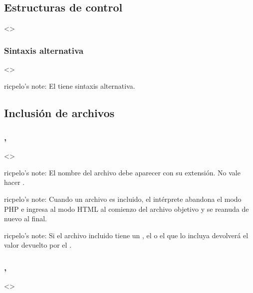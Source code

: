 \documentclass[a4paper,12pt,spanish]{sphinxmanual}
\begin{document}
\subsection{Estructuras de control}
\label{\detokenize{php:estructuras-de-control}}
\textless{}\textgreater{}


\subsubsection{Sintaxis alternativa}
\label{\detokenize{php:sintaxis-alternativa}}
\textless{}\textgreater{}

ricpelo’s note: El   tiene sintaxis
alternativa.


\subsection{Inclusión de archivos}
\label{\detokenize{php:inclusion-de-archivos}}

\subsubsection{, }
\label{\detokenize{php:include-require}}
\textless{}\textgreater{}

\begin{DUlineblock}{0em}
\item[] ricpelo’s note: El nombre del archivo debe aparecer con su extensión.
No vale hacer .
\item[] ricpelo’s note: Cuando un archivo es incluido, el intérprete abandona
el modo PHP e ingresa al modo HTML al comienzo del archivo objetivo y
se reanuda de nuevo al final.
\item[] ricpelo’s note: Si el archivo incluido tiene un , el
 o el  que lo incluya devolverá el valor
devuelto por el .
\end{DUlineblock}


\subsubsection{, }
\label{\detokenize{php:include-once-require-once}}
\textless{}\textgreater{}
\end{document}
